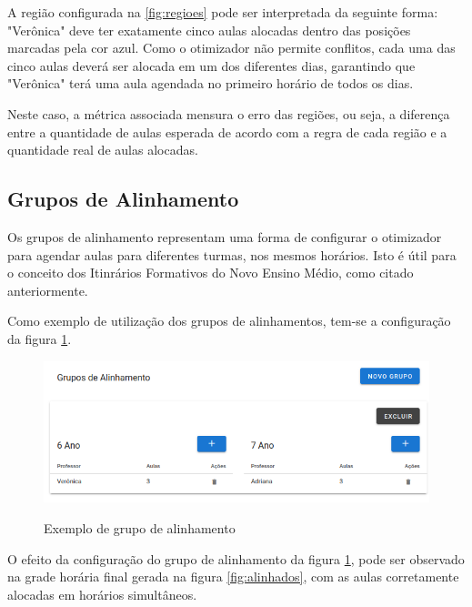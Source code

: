 A região configurada na \ref{fig:regioes} pode ser interpretada da seguinte forma: "Verônica" deve ter exatamente cinco aulas alocadas dentro das posições marcadas pela cor azul. Como o otimizador não permite conflitos, cada uma das cinco aulas deverá ser alocada em um dos diferentes dias, garantindo que "Verônica" terá uma aula agendada no primeiro horário de todos os dias.

Neste caso, a métrica associada mensura o erro das regiões, ou seja, a diferença entre a quantidade de aulas esperada de acordo com a regra de cada região e a quantidade real de aulas alocadas.

\subsection{Grupos de Alinhamento}

Os grupos de alinhamento representam uma forma de configurar o otimizador para agendar aulas para diferentes turmas, nos mesmos horários. Isto é útil para o conceito dos Itinrários Formativos do Novo Ensino Médio, como citado anteriormente.

Como exemplo de utilização dos grupos de alinhamentos, tem-se a configuração da figura \ref{fig:gruposAlinhamento}.

\begin{figure}[!htb]
	\centering
	\caption{Exemplo de grupo de alinhamento}
	\includegraphics[width=1\textwidth]{./dados/figuras/gruposAlinhamento}
	\label{fig:gruposAlinhamento}
\end{figure}
\pagebreak

O efeito da configuração do grupo de alinhamento da figura \ref{fig:gruposAlinhamento}, pode ser observado na grade horária final gerada na figura \ref{fig:alinhados}, com as aulas corretamente alocadas em horários simultâneos.

